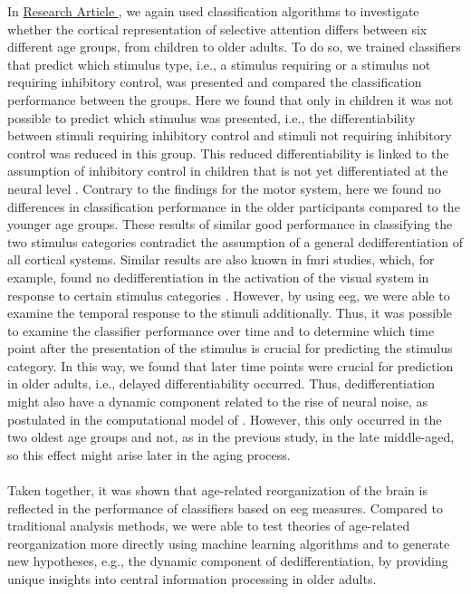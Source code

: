 In \hyperref[results:paperII]{Research Article }, we again used classification algorithms to investigate whether the cortical representation of selective attention differs between six different age groups, from children to older adults. To do so, we trained classifiers that predict which stimulus type, i.e., a stimulus requiring or a stimulus not requiring inhibitory control, was presented and compared the classification performance between the groups. Here we found that only in children it was not possible to predict which stimulus was presented, i.e., the differentiability between stimuli requiring inhibitory control and stimuli not requiring inhibitory control was reduced in this group. This reduced differentiability is linked to the assumption of inhibitory control in children that is not yet differentiated at the neural level \cite{Waszak2010, Reuter2019}. Contrary to the findings for the motor system, here we found no differences in classification performance in the older participants compared to the younger age groups. These results of similar good performance in classifying the two stimulus categories contradict the assumption of a general dedifferentiation of all cortical systems. Similar results are also known in \gls{fmri} studies, which, for example, found no dedifferentiation in the activation of the visual system in response to certain stimulus categories \cite{Voss2008}. However, by using \gls{eeg}, we were able to examine the temporal response to the stimuli additionally. Thus, it was possible to examine the classifier performance over time and to determine which time point after the presentation of the stimulus is crucial for predicting the stimulus category. In this way, we found that later time points were crucial for prediction in older adults, i.e., delayed differentiability occurred. Thus, dedifferentiation might also have a dynamic component related to the rise of neural noise, as postulated in the computational model of \citeauthor{Li2001} \cite{Li2001, Li2000}. However, this only occurred in the two oldest age groups and not, as in the previous study, in the late middle-aged, so this effect might arise later in the aging process.\\
\\
Taken together, it was shown that age-related reorganization of the brain is reflected in the performance of classifiers based on \gls{eeg} measures. Compared to traditional analysis methods, we were able to test theories of age-related reorganization more directly using machine learning algorithms and to generate new hypotheses, e.g., the dynamic component of dedifferentiation, by providing unique insights into central information processing in older adults.\\

